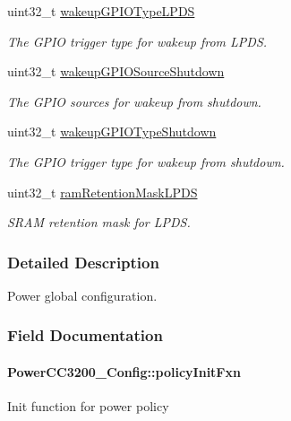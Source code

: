 \begin{DoxyCompactItemize}
uint32\+\_\+t \hyperlink{struct_power_c_c3200___config_a5125aca3ead9428e8d3bc41fab9740b3}{wakeup\+G\+P\+I\+O\+Type\+L\+P\+D\+S}
\begin{DoxyCompactList}\small\item\em The G\+P\+I\+O trigger type for wakeup from L\+P\+D\+S. \end{DoxyCompactList}\item 
uint32\+\_\+t \hyperlink{struct_power_c_c3200___config_a1ba7e114e7d9d1497827dd091306ea9b}{wakeup\+G\+P\+I\+O\+Source\+Shutdown}
\begin{DoxyCompactList}\small\item\em The G\+P\+I\+O sources for wakeup from shutdown. \end{DoxyCompactList}\item 
uint32\+\_\+t \hyperlink{struct_power_c_c3200___config_abc6ba79edc3a18cc50df359d0e15b04e}{wakeup\+G\+P\+I\+O\+Type\+Shutdown}
\begin{DoxyCompactList}\small\item\em The G\+P\+I\+O trigger type for wakeup from shutdown. \end{DoxyCompactList}\item 
uint32\+\_\+t \hyperlink{struct_power_c_c3200___config_a747fa07fcfe34f7a787c1edab75a4b85}{ram\+Retention\+Mask\+L\+P\+D\+S}
\begin{DoxyCompactList}\small\item\em S\+R\+A\+M retention mask for L\+P\+D\+S. \end{DoxyCompactList}\end{DoxyCompactItemize}


\subsubsection{Detailed Description}
Power global configuration. 

\subsubsection{Field Documentation}
\paragraph[{policy\+Init\+Fxn}]{ Power\+C\+C3200\+\_\+\+Config\+::policy\+Init\+Fxn}\label{struct_power_c_c3200___config_af931539deba8a64c4478af415aa9e260}
Init function for power policy 
